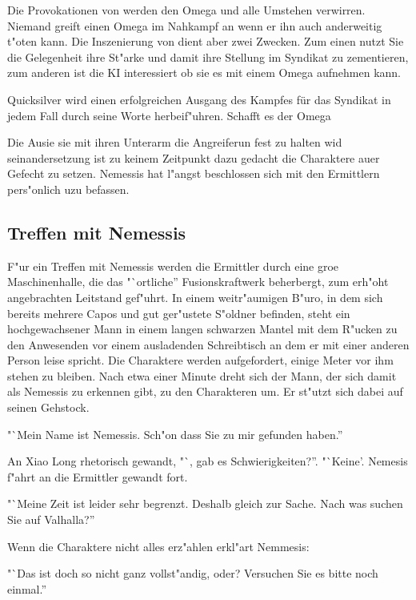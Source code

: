 \begin{remarks}
	Die Provokationen von \xl{} werden den Omega und alle Umstehen verwirren. Niemand greift einen Omega im Nahkampf an wenn er ihn auch anderweitig t"oten kann. Die Inszenierung von \xl{} dient aber zwei Zwecken. Zum einen nutzt Sie die Gelegenheit ihre St"arke und damit ihre Stellung im Syndikat zu zementieren, zum anderen ist die KI interessiert ob sie es mit einem Omega aufnehmen kann. 
	
	Quicksilver wird einen erfolgreichen Ausgang des Kampfes für das Syndikat in jedem Fall durch seine Worte herbeif"uhren. Schafft es der Omega 

	Die Ausie sie mit ihren Unterarm die Angreiferun fest zu halten wid seinandersetzung ist zu keinem Zeitpunkt dazu gedacht die Charaktere au\3er Gefecht zu setzen. Nemessis hat l"angst beschlossen sich mit den Ermittlern pers"onlich uzu befassen.
\end{remarks}

\subsection{Treffen mit Nemessis}

F"ur ein Treffen mit Nemessis werden die Ermittler durch eine gro\3e Maschinenhalle, die das "`ortliche'' Fusionskraftwerk beherbergt, zum erh"oht angebrachten Leitstand gef"uhrt. In einem weitr"aumigen B"uro, in dem sich bereits mehrere Capos und gut ger"ustete S"oldner befinden, steht ein hochgewachsener Mann in einem langen schwarzen Mantel mit dem R"ucken zu den Anwesenden vor einem ausladenden Schreibtisch an dem er mit einer anderen Person leise spricht. Die Charaktere werden aufgefordert, einige Meter vor ihm stehen zu bleiben. Nach etwa einer Minute dreht sich der Mann, der sich damit als Nemessis zu erkennen gibt, zu den Charakteren um. Er st"utzt sich dabei auf seinen Gehstock.

"`Mein Name ist Nemessis. Sch"on dass Sie zu mir gefunden haben.'' 

An Xiao Long rhetorisch gewandt, "`\xl{}, gab es Schwierigkeiten?''. \xl{}  "`Keine'. Nemesis f"ahrt an die Ermittler gewandt fort. 

"`Meine Zeit ist leider sehr begrenzt. Deshalb gleich zur Sache. Nach was suchen Sie auf Valhalla?''

Wenn die Charaktere nicht alles erz"ahlen erkl"art Nemmesis:

"`Das ist doch so nicht ganz vollst"andig, oder? Versuchen Sie es bitte noch einmal.''

